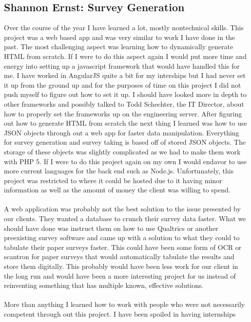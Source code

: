 \documentclass[../final.tex]{subfiles}
\begin{document}
\subsection{Shannon Ernst: Survey Generation}
Over the course of the year I have learned a lot, mostly 
nontechnical skills. This project was a web based app and 
was very similar to work I have done in the past. The most 
challenging aspect was learning how to dynamically generate 
HTML from scratch. If I were to do this aspect again I would 
put more time and energy into setting up a javascript framework 
that would have handled this for me. I have worked in AngularJS 
quite a bit for my interships but I had never set it up from 
the ground up and for the purposes of time on this project I did 
not push myself to figure out how to set it up. I should have looked 
more in depth to other frameworks and possibly talked to Todd Schechter,
 the IT Director, about how to properly set the frameworks up on 
 the engineering server. After figuring out how to generate HTML 
from scratch the next thing I learned was how to use JSON objects 
through out a web app for faster data manipulation. Everything for 
survey generation and survey taking is based off of stored JSON objects.
The storage of these objects was slightly complicated as we had to make 
them work with PHP 5. If I were to do this project again on my own I would 
endavor to use more current languages for the back end such as Node.js. 
Unfortunately, this project was restricted to where it could be hosted 
due to it having minor information as well as the amount of money the 
client was willing to spend. \\\\
A web application was probably not the best solution to the issue 
presented by our clients. They wanted a database to crunch their survey 
data faster. What we should have done was instruct them on how to use 
Qualtrics or another preexisting survey software and came up with a 
solution to what they could to tabulate their paper surveys faster. This 
could have been some form of OCR or scantron for paper surveys that would 
automatically tabulate the results and store them digitally. This probably 
would have been less work for our client in the long run and would have 
been a more interesting project for us instead of reinventing something that 
has multiple known, effective solutions. \\\\
More than anything I learned how to work with people who were not necessarily 
competent through out this project. I have been spoiled in having internships 
\end{document}
